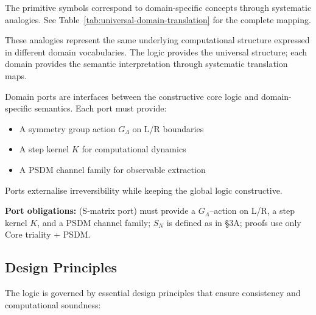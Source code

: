 The primitive symbols correspond to domain-specific concepts through systematic analogies. See Table~\ref{tab:universal-domain-translation} for the complete mapping.

These analogies represent the same underlying computational structure expressed in different domain vocabularies. The logic provides the universal structure; each domain provides the semantic interpretation through systematic translation maps.

\begin{definition}
\label{def:domain-ports}
Domain ports are interfaces between the constructive core logic and domain-specific semantics. Each port must provide:
\begin{itemize}
\item A symmetry group action $G_\Lambda$ on L/R boundaries
\item A step kernel $K$ for computational dynamics
\item A PSDM channel family for observable extraction
\end{itemize}
Ports externalise irreversibility while keeping the global logic constructive.
\end{definition}

\textbf{Port obligations:} (S‑matrix port) must provide a $G_\Lambda$–action on L/R, a step kernel $K$, and a PSDM channel family; $S_N$ is defined as in §3A; proofs use only Core triality + PSDM.

\subsection{Design Principles}

The logic is governed by essential design principles that ensure consistency and computational soundness:

